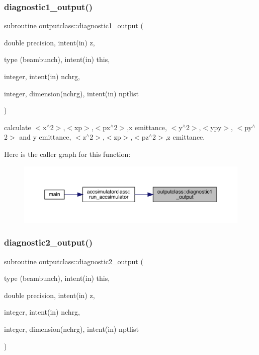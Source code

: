 \subsubsection{\texorpdfstring{diagnostic1\_output()}{diagnostic1\_output()}}
{\footnotesize\ttfamily subroutine outputclass\+::diagnostic1\+\_\+output (\begin{DoxyParamCaption}\item[{double precision, intent(in)}]{z,  }\item[{type (beambunch), intent(in)}]{this,  }\item[{integer, intent(in)}]{nchrg,  }\item[{integer, dimension(nchrg), intent(in)}]{nptlist }\end{DoxyParamCaption})}



calculate $<$x$^\wedge$2$>$,$<$xp$>$,$<$px$^\wedge$2$>$,x emittance, $<$y$^\wedge$2$>$,$<$ypy$>$, $<$py$^\wedge$2$>$ and y emittance, $<$z$^\wedge$2$>$,$<$zp$>$,$<$pz$^\wedge$2$>$,z emittance. 

Here is the caller graph for this function\+:\nopagebreak
\begin{figure}[H]
\begin{center}
\leavevmode
\includegraphics[width=350pt]{namespaceoutputclass_aa94732fb01ea05e3a65d2cb9aa5a0402_icgraph}
\end{center}
\end{figure}
\mbox{\label{namespaceoutputclass_a678b3c4ce8356d742c32eb555ee16f08}} 
\subsubsection{\texorpdfstring{diagnostic2\_output()}{diagnostic2\_output()}}
{\footnotesize\ttfamily subroutine outputclass\+::diagnostic2\+\_\+output (\begin{DoxyParamCaption}\item[{type (beambunch), intent(in)}]{this,  }\item[{double precision, intent(in)}]{z,  }\item[{integer, intent(in)}]{nchrg,  }\item[{integer, dimension(nchrg), intent(in)}]{nptlist }\end{DoxyParamCaption})}

